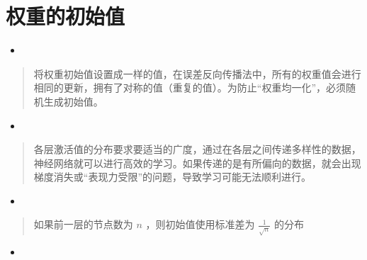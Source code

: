 \documentclass[letterpaper,10pt,english]{sphinxmanual}
\begin{document}
\section{权重的初始值}
\label{\detokenize{_u4e0e_u5b66_u4e60_u76f8_u5173_u7684_u6280_u5de7:id3}}\begin{itemize}
\item {} 

\end{itemize}
\begin{quote}

将权重初始值设置成一样的值，在误差反向传播法中，所有的权重值会进行相同的更新，拥有了对称的值（重复的值）。为防止“权重均一化”，必须随机生成初始值。
\end{quote}
\begin{itemize}
\item {} 

\end{itemize}
\begin{quote}

各层激活值的分布要求要适当的广度，通过在各层之间传递多样性的数据，神经网络就可以进行高效的学习。如果传递的是有所偏向的数据，就会出现梯度消失或“表现力受限”的问题，导致学习可能无法顺利进行。
\end{quote}
\begin{itemize}
\item {} 

\end{itemize}
\begin{quote}

如果前一层的节点数为
\(n\)
，则初始值使用标准差为
\(\frac{1}{\sqrt{n}}\)
的分布

%
\begin{sphinxVerbatim}[commandchars=\\\{\}]
   
     
\end{sphinxVerbatim}
\end{quote}
\begin{itemize}
\item {} 

\end{itemize}
\end{document}
